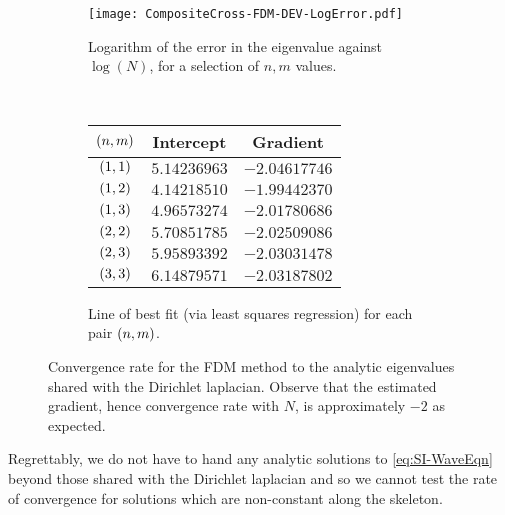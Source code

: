 \begin{figure}[h]
	\centering
	\begin{subfigure}[t]{0.45\textwidth}
		\centering
		\texttt{[image: CompositeCross-FDM-DEV-LogError.pdf]}
		\caption[]{\label{fig:CompositeCross-FDM-DEV-LogError} Logarithm of the error in the eigenvalue against $\log(N)$, for a selection of $n,m$ values.}
	\end{subfigure}
	~
	\begin{subfigure}[t]{0.45\textwidth}
		\centering
		\begin{tabular}[b]{| c | c | c |}
			\hline
			$\left( n,m \right)$ & Intercept & Gradient \\
			\hline
			$\left( 1, 1 \right)$ & $5.14236963$ & $-2.04617746$ \\
			\hline
			$\left( 1, 2 \right)$ & $4.14218510$ & $-1.99442370$ \\
			\hline
			$\left( 1, 3 \right)$ & $4.96573274$ & $-2.01780686$ \\
			\hline
			$\left( 2, 2 \right)$ & $5.70851785$ & $-2.02509086$ \\
			\hline
			$\left( 2, 3 \right)$ & $5.95893392$ & $-2.03031478$ \\
			\hline
			$\left( 3, 3 \right)$ & $6.14879571$ & $-2.03187802$ \\
			\hline
		\end{tabular}
		\caption[]{\label{fig:CompositeCross-FDM-DEV-LoBF} Line of best fit (via least squares regression) for each pair $\left( n,m \right)$.}
	\end{subfigure}
	\caption[Error in the eigenvalue approximation as a function of mesh size, for the cross-in-the-plane geometry.]{\label{fig:CompositeCross-FDM-DEV} Convergence rate for the FDM method to the analytic eigenvalues shared with the Dirichlet laplacian. Observe that the estimated gradient, hence convergence rate with $N$, is approximately $-2$ as expected.}
\end{figure}
Regrettably, we do not have to hand any analytic solutions to \eqref{eq:SI-WaveEqn} beyond those shared with the Dirichlet laplacian and so we cannot test the rate of convergence for solutions which are non-constant along the skeleton. 

